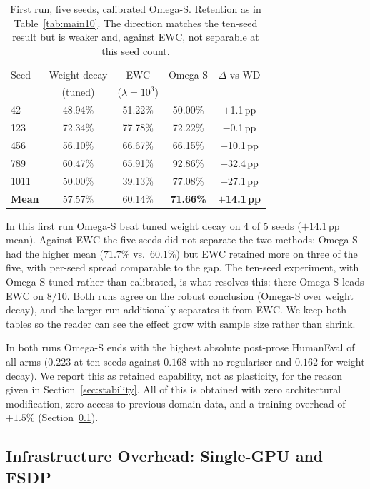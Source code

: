 \documentclass[11pt,a4paper]{article}
\begin{document}
\begin{table}[ht]
\centering
\caption{First run, five seeds, calibrated Omega-S. Retention as in
Table~\ref{tab:main10}. The direction matches the ten-seed result but is
weaker and, against EWC, not separable at this seed count.}
\label{tab:forgetting}
\begin{tabular}{lcccc}
\toprule
Seed & Weight decay & EWC & Omega-S & $\Delta$ vs WD \\
     & (tuned)      & ($\lambda{=}10^3$) & & \\
\midrule
42   & 48.94\% & 51.22\% & 50.00\% & $+$1.1\,pp \\
123  & 72.34\% & 77.78\% & 72.22\% & $-$0.1\,pp \\
456  & 56.10\% & 66.67\% & 66.15\% & $+$10.1\,pp \\
789  & 60.47\% & 65.91\% & 92.86\% & $+$32.4\,pp \\
1011 & 50.00\% & 39.13\% & 77.08\% & $+$27.1\,pp \\
\midrule
\textbf{Mean} & 57.57\% & 60.14\% & \textbf{71.66\%} & \textbf{$+$14.1\,pp} \\
\bottomrule
\end{tabular}
\end{table}

In this first run Omega-S beat tuned weight decay on 4 of 5 seeds
($+14.1$\,pp mean). Against EWC the five seeds did not separate the two
methods: Omega-S had the higher mean ($71.7\%$ vs.\ $60.1\%$) but EWC
retained more on three of the five, with per-seed spread comparable to the
gap. The ten-seed experiment, with Omega-S tuned rather than calibrated,
is what resolves this: there Omega-S leads EWC on $8/10$. Both runs agree on
the robust conclusion (Omega-S over weight decay), and the larger run
additionally separates it from EWC. We keep both tables so the reader can
see the effect grow with sample size rather than shrink.

In both runs Omega-S ends with the highest absolute post-prose HumanEval of
all arms ($0.223$ at ten seeds against $0.168$ with no regulariser and $0.162$
for weight decay). We report this as retained capability, not as plasticity,
for the reason given in Section~\ref{sec:stability}. All of this is obtained with zero
architectural modification, zero access to previous domain data, and a
training overhead of $+1.5\%$ (Section~\ref{sec:infra}).

\subsection{Infrastructure Overhead: Single-GPU and FSDP}
\label{sec:infra}
\end{document}
